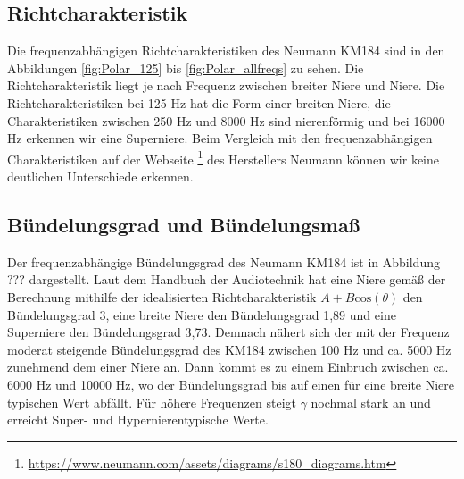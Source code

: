 \subsection{Richtcharakteristik}
Die frequenzabhängigen Richtcharakteristiken des Neumann KM184 sind in den Abbildungen \ref{fig:Polar_125} bis \ref{fig:Polar_allfreqs} zu sehen.
Die Richtcharakteristik liegt je nach Frequenz zwischen breiter Niere und Niere. 
Die Richtcharakteristiken bei 125 Hz hat die Form einer breiten Niere, die Charakteristiken zwischen 250 Hz und 8000 Hz sind nierenförmig und bei 16000 Hz erkennen wir eine Superniere.
Beim Vergleich mit den frequenzabhängigen Charakteristiken auf der Webseite \footnote{\url{https://www.neumann.com/assets/diagrams/s180_diagrams.htm}} des Herstellers Neumann können wir keine deutlichen Unterschiede erkennen.


\subsection{Bündelungsgrad und Bündelungsmaß}
\label{subsec:e}
Der frequenzabhängige Bündelungsgrad des Neumann KM184 ist in Abbildung ??? dargestellt. 
Laut dem Handbuch der Audiotechnik \cite{Weinzierl08} hat eine Niere gemäß der Berechnung mithilfe der idealisierten Richtcharakteristik $A + B \mathrm{cos}(\theta)$ den Bündelungsgrad 3, eine breite Niere den Bündelungsgrad 1,89 und eine Superniere den Bündelungsgrad 3,73.
Demnach nähert sich der mit der Frequenz moderat steigende Bündelungsgrad des KM184 zwischen 100 Hz und ca. 5000 Hz zunehmend dem einer Niere an.
Dann kommt es zu einem Einbruch zwischen ca. 6000 Hz und 10000 Hz, wo der Bündelungsgrad bis auf einen für eine breite Niere typischen Wert abfällt. 
Für höhere Frequenzen steigt $\gamma$ nochmal stark an und erreicht  Super- und Hypernierentypische Werte.

